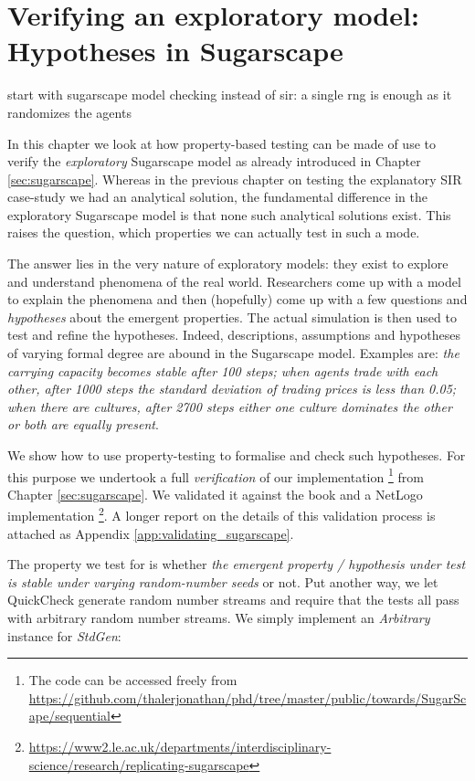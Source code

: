\chapter{Verifying an exploratory model: \\ Hypotheses in Sugarscape}
\label{ch:prop_exploratory}
start with sugarscape model checking instead of sir: a single rng is enough as it randomizes the agents

In this chapter we look at how property-based testing can be made of use to verify the \textit{exploratory} Sugarscape model \cite{epstein_growing_1996} as already introduced in Chapter \ref{sec:sugarscape}. Whereas in the previous chapter on testing the explanatory SIR case-study we had an analytical solution, the fundamental difference in the exploratory Sugarscape model is that none such analytical solutions exist. This raises the question, which properties we can actually test in such a mode.

The answer lies in the very nature of exploratory models: they exist to explore and understand phenomena of the real world. Researchers come up with a model to explain the phenomena and then (hopefully) come up with a few questions and  \textit{hypotheses} about the emergent properties. The actual simulation is then used to test and refine the hypotheses. Indeed, descriptions, assumptions and hypotheses of varying formal degree are abound in the Sugarscape model. Examples are: \textit{the carrying capacity becomes stable after 100 steps; when agents trade with each other, after 1000 steps the standard deviation of trading prices is less than 0.05; when there are cultures, after 2700 steps either one culture dominates the other or both are equally present}. 

We show how to use property-testing to formalise and check such hypotheses. For this purpose we undertook a full \textit{verification} of our implementation \footnote{The code can be accessed freely from \url{https://github.com/thalerjonathan/phd/tree/master/public/towards/SugarScape/sequential}} from Chapter \ref{sec:sugarscape}. We validated it against the book \cite{epstein_growing_1996} and a NetLogo implementation \cite{weaver_replicating_2009} \footnote{\url{https://www2.le.ac.uk/departments/interdisciplinary-science/research/replicating-sugarscape}}. A longer report on the details of this validation process is attached as Appendix \ref{app:validating_sugarscape}.

The property we test for is whether \textit{the emergent property / hypothesis under test is stable under varying random-number seeds} or not. Put another way, we let QuickCheck generate random number streams and require that the tests all pass with arbitrary random number streams. We simply implement an \textit{Arbitrary} instance for \textit{StdGen}:

